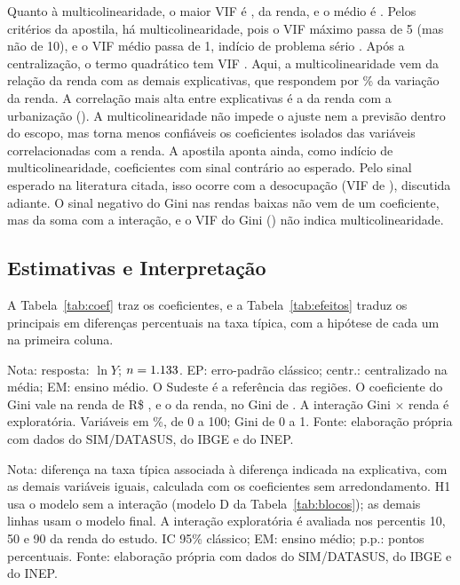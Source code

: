 \documentclass[a4paper,11pt]{article}
\newcommand{\fonte}{Fonte: elaboração própria com dados do SIM/DATASUS, do IBGE e do INEP.}
\newcommand{\nota}[2][\fonte]{\par\vspace{2pt}\begin{minipage}{\linewidth}\footnotesize Nota: #2 #1\end{minipage}}
\begin{document}
Quanto à multicolinearidade, o maior VIF é \nVIFrendaFinal, da renda, e o médio é \nVIFmedio. Pelos critérios da apostila, há multicolinearidade, pois o VIF máximo passa de 5 (mas não de 10), e o VIF médio passa de 1, indício de problema sério \citep[cap.~6]{ferrari2023}. Após a centralização, o termo quadrático tem VIF \nVIFquad. Aqui, a multicolinearidade vem da relação da renda com as demais explicativas, que respondem por \nRdoisRenda\% da variação da renda. A correlação mais alta entre explicativas é a da renda com a urbanização (\nCorRendaUrbana). A multicolinearidade não impede o ajuste nem a previsão dentro do escopo, mas torna menos confiáveis os coeficientes isolados das variáveis correlacionadas com a renda. A apostila aponta ainda, como indício de multicolinearidade, coeficientes com sinal contrário ao esperado. Pelo sinal esperado na literatura citada, isso ocorre com a desocupação (VIF de \nVIFdesoc), discutida adiante. O sinal negativo do Gini nas rendas baixas não vem de um coeficiente, mas da soma com a interação, e o VIF do Gini (\nVIFgini) não indica multicolinearidade.

\subsection{Estimativas e Interpretação}

A Tabela~\ref{tab:coef} traz os coeficientes, e a Tabela~\ref{tab:efeitos} traduz os principais em diferenças percentuais na taxa típica, com a hipótese de cada um na primeira coluna.

\begin{table}[!htb]
\centering
\caption{Coeficientes do modelo final}
\label{tab:coef}
\small
\setlength{\tabcolsep}{3pt}
%
\nota{resposta: $\ln Y$; $n = 1.133$. EP: erro-padrão clássico; centr.: centralizado na média; EM: ensino médio. O Sudeste é a referência das regiões. O coeficiente do Gini vale na renda de R\$ \nCentroRenda{}, e o da renda, no Gini de \nCentroGini. A interação Gini $\times$ renda é exploratória. Variáveis em \%, de 0 a 100; Gini de 0 a 1.}
\end{table}

\begin{table}[!htb]
\centering
\caption{Diferenças percentuais na taxa típica}
\label{tab:efeitos}
\small
\setlength{\tabcolsep}{4pt}
%
\nota{diferença na taxa típica associada à diferença indicada na explicativa, com as demais variáveis iguais, calculada com os coeficientes sem arredondamento. H1 usa o modelo sem a interação (modelo D da Tabela~\ref{tab:blocos}); as demais linhas usam o modelo final. A interação exploratória é avaliada nos percentis 10, 50 e 90 da renda do estudo. IC 95\% clássico; EM: ensino médio; p.p.: pontos percentuais.}
\end{table}
\end{document}
